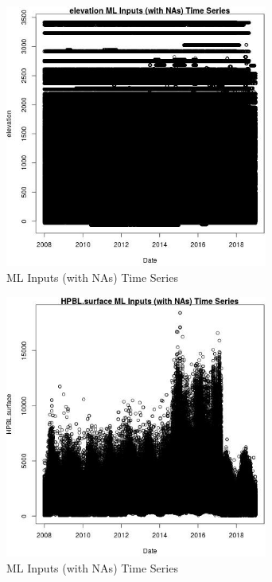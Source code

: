 \begin{figure} 
\centering  
\includegraphics[width=0.77\textwidth]{Code_Outputs/Report_ML_input_PM25_Step4_part_f_de_duplicated_aveswNAs_elevationvDate.jpg} 
\caption{\label{fig:Report_ML_input_PM25_Step4_part_f_de_duplicated_aveswNAselevationvDate}ML Inputs (with NAs) Time Series} 
\end{figure} 
 

\begin{figure} 
\centering  
\includegraphics[width=0.77\textwidth]{Code_Outputs/Report_ML_input_PM25_Step4_part_f_de_duplicated_aveswNAs_HPBLsurfacevDate.jpg} 
\caption{\label{fig:Report_ML_input_PM25_Step4_part_f_de_duplicated_aveswNAsHPBLsurfacevDate}ML Inputs (with NAs) Time Series} 
\end{figure} 
 

